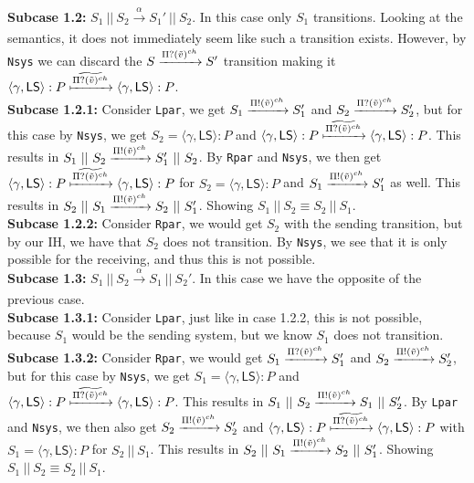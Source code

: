 \indent \textbf{Subcase 1.2: }$S_1 \ || \ S_2 \xrightarrow[]{\alpha} S_1' \ || \ S_2$. In this case only $S_1$ transitions. Looking at the semantics, it does not immediately seem like such a transition exists. However, by \texttt{Nsys} we can discard the $S \xrightarrow[]{\Pi ? (\Tilde{v})^{ch}} S'$ transition making it $\langle \gamma , \mathsf{LS} \rangle : P \xmapsto[]{\widetilde{\Pi ? (\Tilde{v})^{ch}}} \langle \gamma , \mathsf{LS} \rangle : P$.\\ 
\indent \indent \textbf{Subcase 1.2.1: } Consider \texttt{Lpar}, we get $S_1 \xrightarrow[]{\Pi ! (\Tilde{v})^{ch}} S_1' $ and $ S_2 \xrightarrow[]{\Pi ? (\Tilde{v})^{ch}} S_2'$, but for this case by \texttt{Nsys}, we get $S_2=\langle \gamma , \mathsf{LS} \rangle : P$ and $\langle \gamma , \mathsf{LS} \rangle : P  \xmapsto[]{\widetilde{\Pi ? (\Tilde{v})^{ch}}} \langle \gamma , \mathsf{LS} \rangle : P$. This results in $S_1 \ || \ S_2 \xrightarrow[]{\Pi ! (\Tilde{v})^{ch}} S_1' \ || \ S_2$. By \texttt{Rpar} and \texttt{Nsys}, we then get $\langle \gamma , \mathsf{LS} \rangle : P \xmapsto[]{\widetilde{\Pi ? (\Tilde{v})^{ch}}} \langle \gamma , \mathsf{LS} \rangle : P$ for $S_2=\langle \gamma , \mathsf{LS} \rangle : P$ and $S_1 \xrightarrow[]{\Pi ! (\Tilde{v})^{ch}} S_1' $ as well. This results in $S_2 \ || \ S_1 \xrightarrow[]{\Pi ! (\Tilde{v})^{ch}} S_2 \ || \ S_1'$. Showing $S_1 \ || \ S_2 \equiv S_2\ ||\ S_1$.\\
\indent \indent \textbf{Subcase 1.2.2: } Consider \texttt{Rpar}, we would get $S_2$ with the sending transition, but by our IH, we have that $S_2$ does not transition. By \texttt{Nsys}, we see that it is only possible for the receiving, and thus this is not possible.\\
\indent \textbf{Subcase 1.3: }$S_1 \ || \ S_2 \xrightarrow[]{\alpha} S_1 \ || \ S_2'$. In this case we have the opposite of the previous case.\\
\indent \indent \textbf{Subcase 1.3.1: } Consider \texttt{Lpar}, just like in case 1.2.2, this is not possible, because $S_1$ would be the sending system, but we know $S_1$ does not transition.\\
\indent \indent \textbf{Subcase 1.3.2: } Consider \texttt{Rpar}, we would get $S_1 \xrightarrow[]{\Pi ? (\Tilde{v})^{ch}} S_1' $ and $ S_2 \xrightarrow[]{\Pi ! (\Tilde{v})^{ch}} S_2'$, but for this case by \texttt{Nsys}, we get $S_1=\langle \gamma , \mathsf{LS} \rangle : P$ and $\langle \gamma , \mathsf{LS} \rangle : P \xmapsto[]{\widetilde{\Pi ? (\Tilde{v})^{ch}}} \langle \gamma , \mathsf{LS} \rangle : P$. This results in $S_1 \ || \ S_2 \xrightarrow[]{\Pi ! (\Tilde{v})^{ch}} S_1 \ || \ S_2'$. By \texttt{Lpar} and \texttt{Nsys}, we then also get $S_2 \xrightarrow[]{\Pi ! (\Tilde{v})^{ch}} S_2'$ and $\langle \gamma , \mathsf{LS} \rangle : P \xmapsto[]{\widetilde{\Pi ? (\Tilde{v})^{ch}}} \langle \gamma , \mathsf{LS} \rangle : P$ with $S_1=\langle \gamma , \mathsf{LS} \rangle : P$ for $S_2 \ || \ S_1$. This results in $S_2 \ || \ S_1 \xrightarrow[]{\Pi ! (\Tilde{v})^{ch}} S_2 \ || \ S_1'$. Showing $S_1 \ || \ S_2 \equiv S_2\ ||\ S_1$.\\
